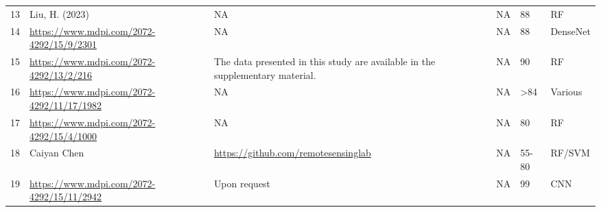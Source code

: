 \documentclass[9pt,lineno]{elife}
\begin{document}
\begin{table}[]
\begin{fullwidth}
\begin{tabular}{p{1cm}p{4cm}p{4cm}p{4cm}p{1cm}p{2cm}}
13 & Liu, H. (2023) & NA                                                                            & NA                                                                                                                              & 88               & RF                  \\
14 & \url{https://www.mdpi.com/2072-4292/15/9/2301}                                                                                                                    & NA                                                                            & NA                                                                                                                              & 88               & DenseNet            \\
15 & \url{https://www.mdpi.com/2072-4292/13/2/216}                                                                                                                     & The data presented in this study are available in the supplementary material. & NA                                                                                                                              & 90               & RF                  \\
16 & \url{https://www.mdpi.com/2072-4292/11/17/1982}                                                                                                                   & NA                                                                            & NA                                                                                                                              & \textgreater{}84 & Various             \\
17 & \url{https://www.mdpi.com/2072-4292/15/4/1000}                                                                                                                    & NA                                                                            & NA                                                                                                                              & 80               & RF                  \\
18 & Caiyan Chen %
& \url{https://github.com/remotesensinglab}                                           & NA                                                                                                                              & 55-80            & RF/SVM              \\
19 & \url{https://www.mdpi.com/2072-4292/15/11/2942}                                                                                                                   & Upon request                                                                  & NA                                                                                                                              & 99               & CNN                 \\

\end{tabular}
\end{fullwidth}
\end{table}
\end{document}
